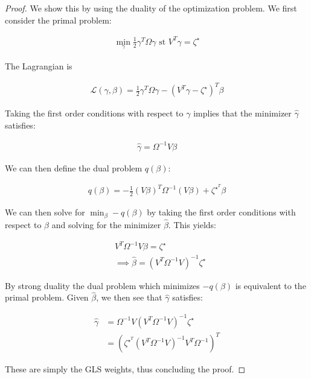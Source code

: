 \begin{proof}
    We show this by using the duality of the optimization problem. We first consider the primal problem:
    
    \begin{align*}
        \min_{\gamma} \frac{1}{2}\gamma^T\Omega\gamma \text{ st } V^T\gamma = \zeta^\star
    \end{align*}
    
    The Lagrangian is
    
    \begin{align*}
        \mathcal{L}(\gamma, \beta) = \frac{1}{2}\gamma^T\Omega\gamma - (V^T\gamma - \zeta^\star)^T\beta
    \end{align*}
    
    Taking the first order conditions with respect to $\gamma$ implies that the minimizer $\hat{\gamma}$ satisfies:
    
    \begin{align*}
        \hat{\gamma} = \Omega^{-1}V\beta
    \end{align*}

    We can then define the dual problem $q(\beta)$:
    
    \begin{align*}
        q(\beta) = -\frac{1}{2}(V\beta)^T\Omega^{-1}(V\beta) + \zeta^\star^T\beta
    \end{align*}
    
    We can then solve for $\min_{\beta} -q(\beta)$ by taking the first order conditions with respect to $\beta$ and solving for the minimizer $\hat{\beta}$. This yields:
    
    \begin{align*}
        & V^T\Omega^{-1}V\beta = \zeta^\star \\
        &\implies \hat{\beta} = (V^T\Omega^{-1}V)^{-1}\zeta^\star
    \end{align*}
    
    By strong duality the dual problem which minimizes $-q(\beta)$ is equivalent to the primal problem. Given $\hat{\beta}$, we then see that $\hat{\gamma}$ satisfies:
    
    \begin{align*}
        \hat{\gamma} &= \Omega^{-1}V(V^T\Omega^{-1}V)^{-1}\zeta^\star \\
        &= (\zeta^\star^T(V^T\Omega^{-1}V)^{-1}V^T\Omega^{-1})^T
    \end{align*}
    
    These are simply the GLS weights, thus concluding the proof.
\end{proof}

